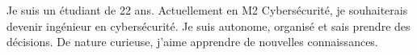 
\begin{cvparagraph}
Je suis un étudiant de 22 ans. Actuellement en M2 Cybersécurité, je souhaiterais devenir ingénieur en
cybersécurité. Je suis autonome, organisé et sais prendre des décisions. De nature curieuse, j'aime apprendre de nouvelles connaissances.
\end{cvparagraph}

